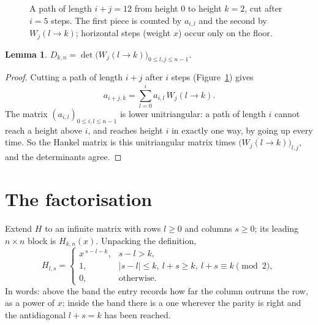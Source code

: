 \documentclass[11pt]{amsart}
\newtheorem{lemma}{Lemma}
\theoremstyle{definition}
\begin{document}
\begin{figure}[ht]
\centering
{}
\caption{A path of length $i+j=12$ from height $0$ to height $k=2$, cut after $i=5$ steps. The first piece is counted
by $a_{i,l}$ and the second by $W_j(l\to k)$; horizontal steps (weight $x$) occur only on the floor.}
\label{fig:cut}
\end{figure}

\begin{lemma}\label{lem:cut}
$D_{k,n}=\det\big(W_j(l\to k)\big)_{0\le l,j\le n-1}$.
\end{lemma}

\begin{proof}
Cutting a path of length $i+j$ after $i$ steps (Figure~\ref{fig:cut}) gives
\[
a_{i+j,k}=\sum_{l=0}^{i}a_{i,l}\,W_j(l\to k).
\]
The matrix $(a_{i,l})_{0\le i,l\le n-1}$ is lower unitriangular: a path of length $i$ cannot reach a height above $i$,
and reaches height $i$ in exactly one way, by going up every time. So the Hankel matrix is this unitriangular matrix
times $\big(W_j(l\to k)\big)_{l,j}$, and the determinants agree.
\end{proof}

\section{The factorisation}\label{sec:step3}

Extend $H$ to an infinite matrix with rows $l\ge0$ and columns $s\ge0$; its leading $n\times n$ block is $H_{k,n}(x)$.
Unpacking the definition,
\begin{equation}\label{eq:H}
H_{l,s}=\begin{cases}x^{\,s-l-k}, & s-l>k,\\ 1, & |s-l|\le k,\ l+s\ge k,\ l+s\equiv k \pmod 2,\\ 0,&\text{otherwise.}\end{cases}
\end{equation}
In words: above the band the entry records how far the column outruns the row, as a power of $x$; inside the band
there is a one wherever the parity is right and the antidiagonal $l+s=k$ has been reached.
\end{document}
